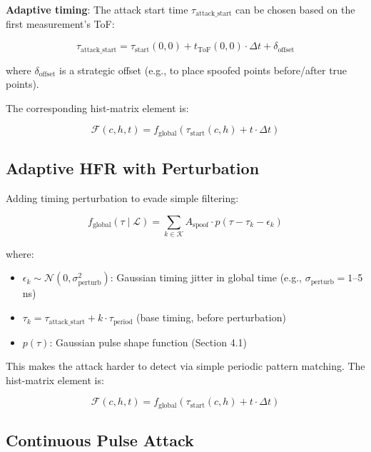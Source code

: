 \documentclass[11pt]{article}
\begin{document}
\textbf{Adaptive timing}: The attack start time $\tau_{\text{attack\_start}}$ can be chosen based on the first measurement's ToF:

\begin{equation}
\tau_{\text{attack\_start}} = \tau_{\text{start}}(0, 0) + t_{\text{ToF}}(0, 0) \cdot \Delta t + \delta_{\text{offset}}
\end{equation}

where $\delta_{\text{offset}}$ is a strategic offset (e.g., to place spoofed points before/after true points).

The corresponding hist-matrix element is:

\begin{equation}
\mathcal{F}(c, h, t) = f_{\text{global}}(\tau_{\text{start}}(c, h) + t \cdot \Delta t)
\end{equation}

\subsection{Adaptive HFR with Perturbation}

Adding timing perturbation to evade simple filtering:

\begin{equation}
f_{\text{global}}(\tau \mid \bm{\mathcal{L}}) = \sum_{k \in \mathcal{K}} A_{\text{spoof}} \cdot p(\tau - \tau_k - \epsilon_k)
\end{equation}

where:
\begin{itemize}
    \item $\epsilon_k \sim \mathcal{N}(0, \sigma^2_{\text{perturb}})$: Gaussian timing jitter in global time (e.g., $\sigma_{\text{perturb}} = 1$--5 ns)
    \item $\tau_k = \tau_{\text{attack\_start}} + k \cdot \tau_{\text{period}}$ (base timing, before perturbation)
    \item $p(\tau)$: Gaussian pulse shape function (Section 4.1)
\end{itemize}

This makes the attack harder to detect via simple periodic pattern matching. The hist-matrix element is:

\begin{equation}
\mathcal{F}(c, h, t) = f_{\text{global}}(\tau_{\text{start}}(c, h) + t \cdot \Delta t)
\end{equation}

\subsection{Continuous Pulse Attack}
\end{document}
